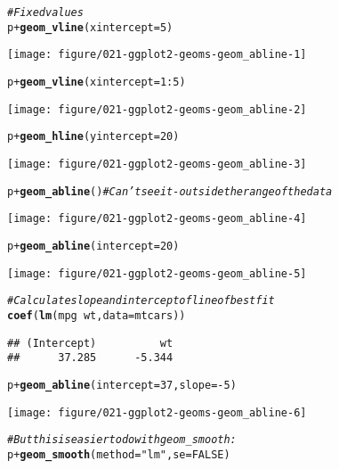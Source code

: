 \documentclass[a4paper,titlepage]{tufte-handout}\usepackage[]{graphicx}\usepackage[]{xcolor}
\makeatletter
\def\maxwidth{ %
  \ifdim\Gin@nat@width>\linewidth
    \linewidth
  \else
    \Gin@nat@width
  \fi
}
\newcommand{\hlnum}[1]{\textcolor[rgb]{0.686,0.059,0.569}{#1}}%
\newcommand{\hlsng}[1]{\textcolor[rgb]{0.192,0.494,0.8}{#1}}%
\newcommand{\hlcom}[1]{\textcolor[rgb]{0.678,0.584,0.686}{\textit{#1}}}%
\newcommand{\hlopt}[1]{\textcolor[rgb]{0,0,0}{#1}}%
\newcommand{\hldef}[1]{\textcolor[rgb]{0.345,0.345,0.345}{#1}}%
\newcommand{\hlkwc}[1]{\textcolor[rgb]{0.333,0.667,0.333}{#1}}%
\newcommand{\hlkwd}[1]{\textcolor[rgb]{0.737,0.353,0.396}{\textbf{#1}}}%
\newenvironment{kframe}{%
 \def\at@end@of@kframe{}%
 \ifinner\ifhmode%
  \def\at@end@of@kframe{\end{minipage}}%
  \begin{minipage}{\columnwidth}%
 \fi\fi%
 \def\FrameCommand##1{\hskip\@totalleftmargin \hskip-\fboxsep
 \colorbox{shadecolor}{##1}\hskip-\fboxsep
     \hskip-\linewidth \hskip-\@totalleftmargin \hskip\columnwidth}%
 \MakeFramed {\advance\hsize-\width
   \@totalleftmargin\z@ \linewidth\hsize
   \@setminipage}}%
 {\par\unskip\endMakeFramed%
 \at@end@of@kframe}
\newenvironment{knitrout}{}{} %
\makeatother
\begin{document}
\begin{knitrout}
\begin{kframe}
\begin{alltt}
\hlcom{# Fixed values}
\hldef{p} \hlopt{+} \hlkwd{geom_vline}\hldef{(}\hlkwc{xintercept} \hldef{=} \hlnum{5}\hldef{)}
\end{alltt}
\end{kframe}
\texttt{[image: figure/021-ggplot2-geoms-geom\_abline-1]} 
\begin{kframe}\begin{alltt}
\hldef{p} \hlopt{+} \hlkwd{geom_vline}\hldef{(}\hlkwc{xintercept} \hldef{=} \hlnum{1}\hlopt{:}\hlnum{5}\hldef{)}
\end{alltt}
\end{kframe}
\texttt{[image: figure/021-ggplot2-geoms-geom\_abline-2]} 
\begin{kframe}\begin{alltt}
\hldef{p} \hlopt{+} \hlkwd{geom_hline}\hldef{(}\hlkwc{yintercept} \hldef{=} \hlnum{20}\hldef{)}
\end{alltt}
\end{kframe}
\texttt{[image: figure/021-ggplot2-geoms-geom\_abline-3]} 
\begin{kframe}\begin{alltt}
\hldef{p} \hlopt{+} \hlkwd{geom_abline}\hldef{()} \hlcom{# Can't see it - outside the range of the data}
\end{alltt}
\end{kframe}
\texttt{[image: figure/021-ggplot2-geoms-geom\_abline-4]} 
\begin{kframe}\begin{alltt}
\hldef{p} \hlopt{+} \hlkwd{geom_abline}\hldef{(}\hlkwc{intercept} \hldef{=} \hlnum{20}\hldef{)}
\end{alltt}
\end{kframe}
\texttt{[image: figure/021-ggplot2-geoms-geom\_abline-5]} 
\begin{kframe}\begin{alltt}
\hlcom{# Calculate slope and intercept of line of best fit}
\hlkwd{coef}\hldef{(}\hlkwd{lm}\hldef{(mpg} \hlopt{~} \hldef{wt,} \hlkwc{data} \hldef{= mtcars))}
\end{alltt}
\begin{verbatim}
## (Intercept)          wt 
##      37.285      -5.344
\end{verbatim}
\begin{alltt}
\hldef{p} \hlopt{+} \hlkwd{geom_abline}\hldef{(}\hlkwc{intercept} \hldef{=} \hlnum{37}\hldef{,} \hlkwc{slope} \hldef{=} \hlopt{-}\hlnum{5}\hldef{)}
\end{alltt}
\end{kframe}
\texttt{[image: figure/021-ggplot2-geoms-geom\_abline-6]} 
\begin{kframe}\begin{alltt}
\hlcom{# But this is easier to do with geom_smooth:}
\hldef{p} \hlopt{+} \hlkwd{geom_smooth}\hldef{(}\hlkwc{method} \hldef{=} \hlsng{"lm"}\hldef{,} \hlkwc{se} \hldef{=} \hlnum{FALSE}\hldef{)}
\end{alltt}



\end{kframe}
\end{knitrout}
\end{document}
